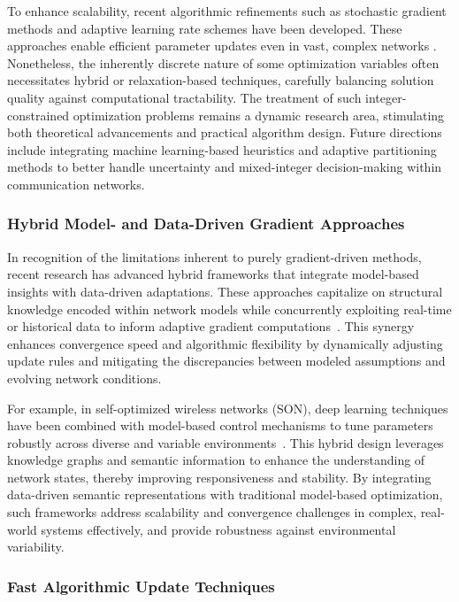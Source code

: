\documentclass[sigconf]{acmart}
\begin{document}
To enhance scalability, recent algorithmic refinements such as stochastic gradient methods and adaptive learning rate schemes have been developed. These approaches enable efficient parameter updates even in vast, complex networks \cite{ref1,ref9,ref10,ref11,ref12,ref14,ref16}. Nonetheless, the inherently discrete nature of some optimization variables often necessitates hybrid or relaxation-based techniques, carefully balancing solution quality against computational tractability. The treatment of such integer-constrained optimization problems remains a dynamic research area, stimulating both theoretical advancements and practical algorithm design. Future directions include integrating machine learning-based heuristics and adaptive partitioning methods to better handle uncertainty and mixed-integer decision-making within communication networks.

\subsubsection{Hybrid Model- and Data-Driven Gradient Approaches}

In recognition of the limitations inherent to purely gradient-driven methods, recent research has advanced hybrid frameworks that integrate model-based insights with data-driven adaptations. These approaches capitalize on structural knowledge encoded within network models while concurrently exploiting real-time or historical data to inform adaptive gradient computations~\cite{ref5,ref7,ref13}. This synergy enhances convergence speed and algorithmic flexibility by dynamically adjusting update rules and mitigating the discrepancies between modeled assumptions and evolving network conditions.

For example, in self-optimized wireless networks (SON), deep learning techniques have been combined with model-based control mechanisms to tune parameters robustly across diverse and variable environments~\cite{ref1}. This hybrid design leverages knowledge graphs and semantic information to enhance the understanding of network states, thereby improving responsiveness and stability. By integrating data-driven semantic representations with traditional model-based optimization, such frameworks address scalability and convergence challenges in complex, real-world systems effectively, and provide robustness against environmental variability.

\subsubsection{Fast Algorithmic Update Techniques}
\end{document}
